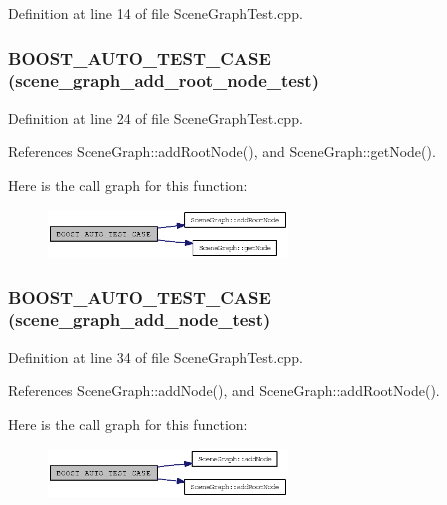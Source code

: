 Definition at line 14 of file SceneGraphTest.cpp.
\subsubsection{\setlength{\rightskip}{0pt plus 5cm}BOOST\_\-AUTO\_\-TEST\_\-CASE (scene\_\-graph\_\-add\_\-root\_\-node\_\-test)}\label{SceneGraphTest_8cpp_ff59ac710519488fcf0379d712d8ef70}




Definition at line 24 of file SceneGraphTest.cpp.

References SceneGraph::addRootNode(), and SceneGraph::getNode().

Here is the call graph for this function:\nopagebreak
\begin{figure}[H]
\begin{center}
\leavevmode
\includegraphics[width=180pt]{SceneGraphTest_8cpp_ff59ac710519488fcf0379d712d8ef70_cgraph}
\end{center}
\end{figure}
\subsubsection{\setlength{\rightskip}{0pt plus 5cm}BOOST\_\-AUTO\_\-TEST\_\-CASE (scene\_\-graph\_\-add\_\-node\_\-test)}\label{SceneGraphTest_8cpp_df69b1bb16fd0ae812e51c9ef665e5da}




Definition at line 34 of file SceneGraphTest.cpp.

References SceneGraph::addNode(), and SceneGraph::addRootNode().

Here is the call graph for this function:\nopagebreak
\begin{figure}[H]
\begin{center}
\leavevmode
\includegraphics[width=180pt]{SceneGraphTest_8cpp_df69b1bb16fd0ae812e51c9ef665e5da_cgraph}
\end{center}
\end{figure}
